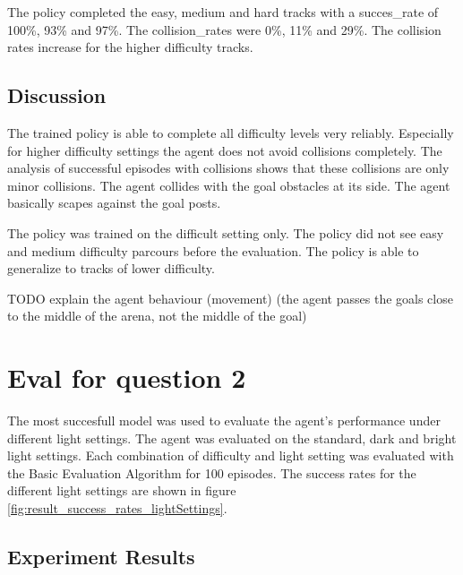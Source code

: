 The policy completed the easy, medium and hard tracks with a succes\_rate of 100\%, 93\% and 97\%. The collision\_rates were 0\%, 11\% and  29\%. The collision rates increase for the higher difficulty tracks.

\subsection{Discussion}

The trained policy is able to complete all difficulty levels very reliably.
Especially for higher difficulty settings the agent does not avoid collisions completely. The analysis of successful episodes with collisions shows that these collisions are only minor collisions. The agent collides with the goal obstacles at its side. The agent basically scapes against the goal posts.

The policy was trained on the difficult setting only. The policy did not see easy and medium difficulty parcours before the evaluation. The policy is able to generalize to tracks of lower difficulty.

TODO explain the agent behaviour (movement)
(the agent passes the goals close to the middle of the arena, not the middle of the goal)

\section{Eval for question 2}

The most succesfull model was used to evaluate the agent's performance under different light settings. The agent was evaluated on the standard, dark and bright light settings. Each combination of difficulty and light setting was evaluated with the Basic Evaluation Algorithm for 100 episodes. The success rates for the different light settings are shown in figure \ref{fig:result_success_rates_lightSettings}.


\subsection{Experiment Results}

